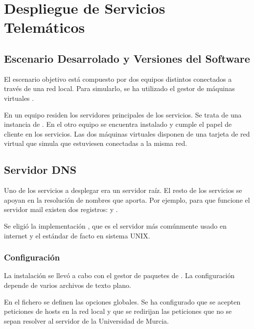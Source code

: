 \section{Despliegue de Servicios Telemáticos}
\subsection{Escenario Desarrolado y Versiones del Software}
El escenario objetivo está compuesto por dos equipos distintos conectados a través de una red local. Para simularlo, se ha utilizado el gestor de máquinas virtuales .

En un equipo residen los servidores principales de los servicios. Se trata de una instancia de . En el otro equipo se encuentra instalado  y cumple el papel de cliente en los servicios. Las dos máquinas virtuales disponen de una tarjeta de red virtual que simula que estuviesen conectadas a la misma red.

\subsection{Servidor DNS}
Uno de los servicios a desplegar era un servidor {\DNS} raíz. El resto de los servicios se apoyan en la resolución de nombres que aporta. Por ejemplo, para que funcione el servidor mail existen dos registros:  y .

Se eligió la implementación , que es el servidor {\DNS} más comúnmente usado en internet y el estándar de facto en sistema UNIX.

\subsubsection{Configuración}
La instalación se llevó a cabo con el gestor de paquetes de . La configuración depende de varios archivos de texto plano.

En el fichero  se definen las opciones globales. Se ha configurado que se acepten peticiones de hosts en la red local y que se redirijan las peticiones que no se sepan resolver al servidor {\DNS} de la Universidad de Murcia.

